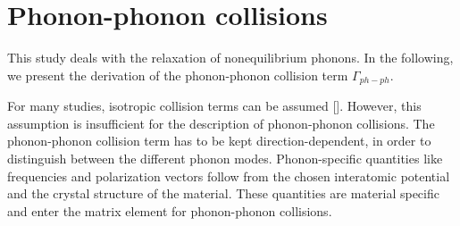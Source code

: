 \documentclass[ aps, prb, reprint, groupedaddress]{revtex4-1}
\makeatletter
\newcommand{\citen}[1]{\def\NAT@spacechar{}[\citenum{#1}]}
\makeatother
\begin{document}




\section{Phonon-phonon collisions}
This study deals with the relaxation of nonequilibrium phonons. In the following, we present the derivation of the phonon-phonon collision term $\Gamma_{ph-ph}$.

For many studies, isotropic collision terms can be assumed \citen{Mueller13PRB, Pietanza07}.
However, this assumption is insufficient for the description of phonon-phonon collisions. The phonon-phonon collision term has to be kept direction-dependent, in order to distinguish between the different 
phonon modes.
Phonon-specific quantities like frequencies and polarization vectors follow from the chosen interatomic potential and the crystal structure of the material. These quantities are material specific and enter the matrix
element for phonon-phonon collisions.
\end{document}
